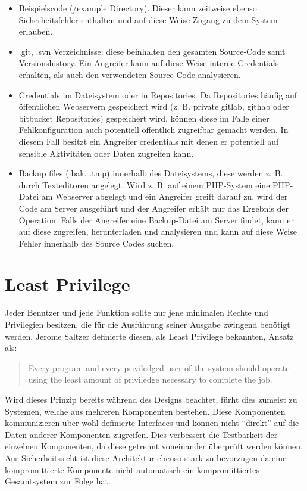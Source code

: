 \begin{itemize}
	\item Beispielscode (/example Directory). Dieser kann zeitweise ebenso Sicherheitsfehler enthalten und auf diese Weise Zugang zu dem System erlauben.
	\item .git, .svn Verzeichnisse: diese beinhalten den gesamten Source-Code samt Versionshistory. Ein Angreifer kann auf diese Weise interne Credentials erhalten, als auch den verwendeten Source Code analysieren.
	\item Credentials im Dateisystem oder in Repositories. Da Repositories häufig auf öffentlichen Webservern gespeichert wird (z. B. private gitlab, githab oder bitbucket Repositories) gespeichert wird, können diese im Falle einer Fehlkonfiguration auch potentiell öffentlich zugreifbar gemacht werden. In diesem Fall besitzt ein Angreifer credentials mit denen er potentiell auf sensible Aktivitäten oder Daten zugreifen kann.
	\item Backup files (.bak, .tmp) innerhalb des Dateisystems, diese werden z. B. durch Texteditoren angelegt. Wird z. B. auf einem PHP-System eine PHP-Datei am Webserver abgelegt und ein Angreifer greift darauf zu, wird der Code am Server ausgeführt und der Angreifer erhält nur das Ergebnis der Operation. Falls der Angreifer eine Backup-Datei am Server findet, kann er auf diese zugreifen, herunterladen und analysieren und kann auf diese Weise Fehler innerhalb des Source Codes suchen.
\end{itemize}

\section{Least Privilege}

Jeder Benutzer und jede Funktion sollte nur jene minimalen Rechte und Privilegien besitzen, die für die Ausführung seiner Ausgabe zwingend benötigt werden. Jerome Saltzer definierte diesen, als Least Privilege bekannten, Ansatz als:

\begin{quote}
Every program and every priviledged user of the system should operate using the least amount of priviledge necessary to complete the job.
\end{quote}

Wird dieses Prinzip bereits während des Designs beachtet, fürht dies zumeist zu Systemen, welche aus mehreren Komponenten bestehen. Diese Komponenten kommunizieren über wohl-definierte Interfaces und können nicht ``direkt'' auf die Daten anderer Komponenten zugreifen. Dies verbessert die Testbarkeit der einzelnen Komponenten, da diese getrennt voneinander überprüft werden können. Aus Sicherheitssicht ist diese Architektur ebenso stark zu bevorzugen da eine kompromittierte Komponente nicht automatisch ein kompromittiertes Gesamtsystem zur Folge hat.

